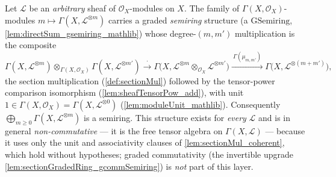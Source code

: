 \begin{lemma}
\leanok
  \label{lem:sectionGradedRing_gsemiring}
  Let \(\mathcal{L}\) be an \emph{arbitrary} sheaf of \(\mathcal{O}_X\)-modules on
  \(X\). The family of \(\Gamma(X,\mathcal{O}_X)\)-modules
  \(m \mapsto \Gamma(X, \mathcal{L}^{\otimes m})\) carries a graded
  \emph{semiring} structure (a \(\mathrm{GSemiring}\),
  \cref{lem:directSum_gsemiring_mathlib}) whose degree-\((m,m')\) multiplication is
  the composite
  \[
    \Gamma(X, \mathcal{L}^{\otimes m}) \otimes_{\Gamma(X,\mathcal{O}_X)}
      \Gamma(X, \mathcal{L}^{\otimes m'})
    \xrightarrow{\ \cdot\ }
    \Gamma\bigl(X, \mathcal{L}^{\otimes m} \otimes_{\mathcal{O}_X}
      \mathcal{L}^{\otimes m'}\bigr)
    \xrightarrow{\ \Gamma(\mu_{m,m'})\ }
    \Gamma\bigl(X, \mathcal{L}^{\otimes (m+m')}\bigr),
  \]
  the section multiplication (\cref{def:sectionMul}) followed by the tensor-power
  comparison isomorphism (\cref{lem:sheafTensorPow_add}), with unit
  \(1 \in \Gamma(X, \mathcal{O}_X) = \Gamma(X, \mathcal{L}^{\otimes 0})\)
  (\cref{lem:moduleUnit_mathlib}). Consequently
  \(\bigoplus_{m \ge 0} \Gamma(X, \mathcal{L}^{\otimes m})\) is a semiring. This
  structure exists for \emph{every} \(\mathcal{L}\) and is in general
  \emph{non-commutative} --- it is the free tensor algebra on
  \(\Gamma(X,\mathcal{L})\) --- because it uses only the unit and associativity
  clauses of \cref{lem:sectionMul_coherent}, which hold without hypotheses; graded
  commutativity (the invertible upgrade \cref{lem:sectionGradedRing_gcommSemiring})
  is \emph{not} part of this layer.
\end{lemma}


